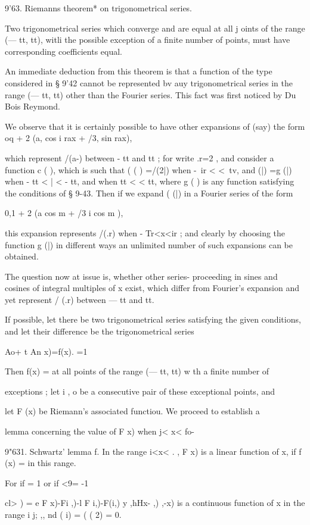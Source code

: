 {9'63. Riemanns theorem* on trigonometrical series.

Two trigonometrical series which converge and are equal at all j oints
of the range (— tt, tt), witli the possible exception of a finite
number of points, must have corresponding coefficients equal.

An immediate deduction from this theorem is that a function of the
type considered in § 9'42 cannot be represented bv auy trigonometrical
series in the range (— tt, tt) other than the Fourier series. This
fact was first noticed by Du Bois Reymond.

We observe that it is certainly possible to have other expansions of
(say) the form oq + 2 (a, cos i rax + /3, sin rax),

which represent /(a-) between - tt and tt ; for write .r=2 , and
consider a function c ( ), which is such that ( ( ) =/(2|) when -\ ir
< <\ tv, and (|) =g (|) when - tt < | < - tt, and when tt < < tt,
where g ( ) is any function satisfying the conditions of § 9-43. Then
if we expand ( (|) in a Fourier series of the form

0,1 + 2 (a cos m + /3 i cos m ),

this expansion represents /(.r) when - Tr<x<ir ; and clearly by
choosing the function g (|) in different ways an unlimited number of
such expansions can be obtained.

The question now at issue is, whether other series- proceeding in
sines and cosines of integral multiples of x exist, which differ from
Fourier's expansion and yet represent / (.r) between — tt and tt.

If possible, let there be two trigonometrical series satisfying the
given conditions, and let their difference be the trigonometrical
series

Ao+ t An x)=f(x). =1

Then f(x) = at all points of the range (— tt, tt) w th a finite number
of

exceptions ; let i , o be a consecutive pair of these exceptional
points, and

let F (x) be Riemann's associated functiou. We proceed to establish a

lemma concerning the value of F x) when j< x< fo-

9"631. Schwartz' lemma f. In the range i<x< . , F x) is a linear
function of x, if f (x) = in this range.

For if = 1 or if <9= -1

cl> ) = e F x)-Fi ,)-l F i,)-F(i,) y ,hHx- ,) ,-x) is a continuous
function of x in the range i j; ,, nd ( i) = ( ( 2) = 0.

}

